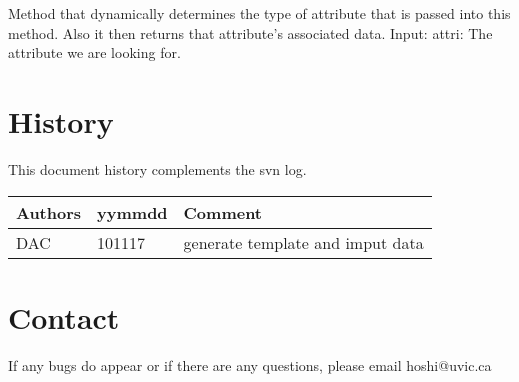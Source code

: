 Method that dynamically determines the type of attribute that is passed into this method. Also it then returns that attribute's
associated data.\newline
Input:\newline
attri: The attribute we are looking for.\newline
		
\section{History} 
This document history complements the svn log.

\begin{tabular*}{\textwidth}{lll}
\hline
Authors & yymmdd & Comment \\
\hline
DAC & 101117 & generate template and imput data\\

\hline
\end{tabular*}


\section{Contact}
If any bugs do appear or if there are any questions, please email hoshi@uvic.ca
\begin{verbatim}

\end{verbatim}


%
%
%
%
